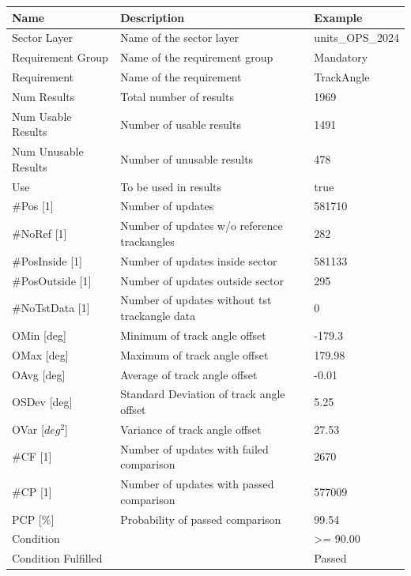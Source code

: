 \begin{center}
 \begin{table}[H]
  \begin{tabularx}{\textwidth}{ | l | X |  l | }
    \hline
    \textbf{Name} & \textbf{Description} & \textbf{Example} \\ \hline
    Sector Layer & Name of the sector layer & units\_OPS\_2024 \\ \hline
    Requirement Group & Name of the requirement group & Mandatory \\ \hline
    Requirement & Name of the requirement & TrackAngle \\ \hline
    Num Results & Total number of results & 1969 \\ \hline
    Num Usable Results & Number of usable results & 1491 \\ \hline
    Num Unusable Results & Number of unusable results & 478 \\ \hline
    Use & To be used in results & true \\ \hline
    \#Pos [1] & Number of updates & 581710 \\ \hline
    \#NoRef [1] & Number of updates w/o reference trackangles & 282 \\ \hline
    \#PosInside [1] & Number of updates inside sector & 581133 \\ \hline
    \#PosOutside [1] & Number of updates outside sector & 295 \\ \hline
    \#NoTstData [1] & Number of updates without tst trackangle data & 0 \\ \hline
    OMin [deg] & Minimum of track angle offset & -179.3 \\ \hline
    OMax [deg] & Maximum of track angle offset & 179.98 \\ \hline
    OAvg [deg] & Average of track angle offset & -0.01 \\ \hline
    OSDev [deg] & Standard Deviation of track angle offset & 5.25 \\ \hline
    OVar [$deg^2$] & Variance of track angle offset & 27.53 \\ \hline
    \#CF [1] & Number of updates with failed comparison & 2670 \\ \hline
    \#CP [1] & Number of updates with passed comparison & 577009 \\ \hline
    PCP [\%] & Probability of passed comparison & 99.54 \\ \hline
    Condition &  & >= 90.00 \\ \hline
    Condition Fulfilled &  & Passed \\ \hline
\end{tabularx}
\end{table}
\end{center}

